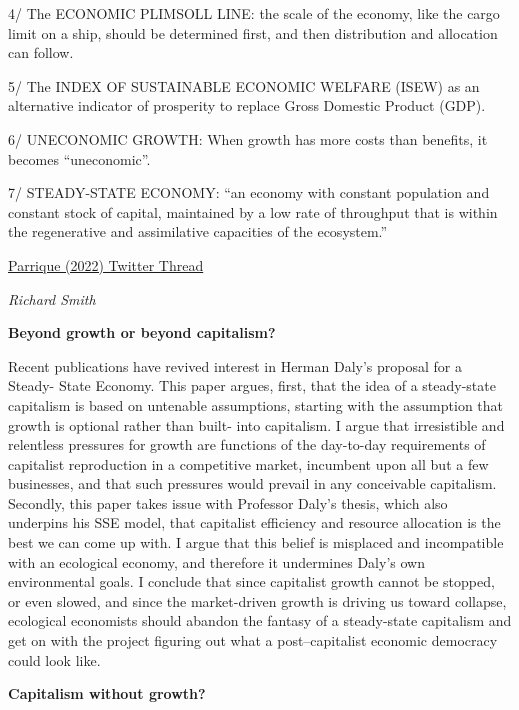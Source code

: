 \documentclass[
]{book}
\begin{document}
4/ The ECONOMIC PLIMSOLL LINE: the scale of the economy, like the cargo limit on a ship, should be determined first, and then distribution and allocation can follow.

5/ The INDEX OF SUSTAINABLE ECONOMIC WELFARE (ISEW) as an alternative indicator of prosperity to replace Gross Domestic Product (GDP).

6/ UNECONOMIC GROWTH: When growth has more costs than benefits, it becomes ``uneconomic''.

7/ STEADY-STATE ECONOMY: ``an economy with constant population and constant stock of capital, maintained by a low rate of throughput that is within the regenerative and assimilative capacities of the ecosystem.''

\href{https://twitter.com/timparrique/status/1587005584636887042}{Parrique (2022) Twitter Thread}

\emph{Richard Smith}

\textbf{Beyond growth or beyond capitalism?}

Recent publications have revived interest in Herman
Daly's proposal for a Steady- State Economy. This paper argues,
first, that the idea of a steady-state capitalism is based on
untenable assumptions, starting with the assumption that growth is
optional rather than built- into capitalism. I argue that irresistible
and relentless pressures for growth are functions of the day-to-day
requirements of capitalist reproduction in a competitive market,
incumbent upon all but a few businesses, and that such pressures
would prevail in any conceivable capitalism. Secondly, this paper
takes issue with Professor Daly's thesis, which also underpins his
SSE model, that capitalist efficiency and resource allocation is the
best we can come up with. I argue that this belief is misplaced and
incompatible with an ecological economy, and therefore it
undermines Daly's own environmental goals. I conclude that since
capitalist growth cannot be stopped, or even slowed, and since the
market-driven growth is driving us toward collapse, ecological
economists should abandon the fantasy of a steady-state capitalism
and get on with the project figuring out what a post--capitalist
economic democracy could look like.

\textbf{Capitalism without growth?}
\end{document}
